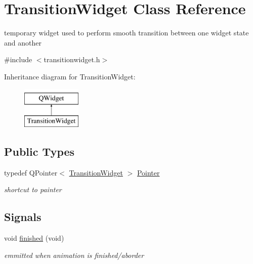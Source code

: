 \hypertarget{class_transition_widget}{}\section{Transition\+Widget Class Reference}
\label{class_transition_widget}


temporary widget used to perform smooth transition between one widget state and another  




{\ttfamily \#include $<$transitionwidget.\+h$>$}

Inheritance diagram for Transition\+Widget\+:\begin{figure}[H]
\begin{center}
\leavevmode
\includegraphics[height=2.000000cm]{class_transition_widget}
\end{center}
\end{figure}
\subsection*{Public Types}
\begin{DoxyCompactItemize}
\item 
\mbox{\label{class_transition_widget_a731ea04484c77905b13d790cf1ffb66e}} 
typedef Q\+Pointer$<$ \hyperlink{class_transition_widget}{Transition\+Widget} $>$ \hyperlink{class_transition_widget_a731ea04484c77905b13d790cf1ffb66e}{Pointer}
\begin{DoxyCompactList}\small\item\em shortcut to painter \end{DoxyCompactList}\end{DoxyCompactItemize}
\subsection*{Signals}
\begin{DoxyCompactItemize}
\item 
\mbox{\label{class_transition_widget_aa5c8633eb231781e0ebe45babfc236d0}} 
void \hyperlink{class_transition_widget_aa5c8633eb231781e0ebe45babfc236d0}{finished} (void)
\begin{DoxyCompactList}\small\item\em emmitted when animation is finished/aborder \end{DoxyCompactList}\end{DoxyCompactItemize}
